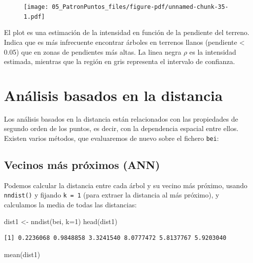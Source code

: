\documentclass[
  letterpaper,
  DIV=11,
  numbers=noendperiod]{scrreprt}
\newenvironment{Shaded}{\begin{snugshade}}{\end{snugshade}}
\newcommand{\AttributeTok}[1]{\textcolor[rgb]{0.40,0.45,0.13}{#1}}
\newcommand{\DecValTok}[1]{\textcolor[rgb]{0.68,0.00,0.00}{#1}}
\newcommand{\FunctionTok}[1]{\textcolor[rgb]{0.28,0.35,0.67}{#1}}
\newcommand{\NormalTok}[1]{\textcolor[rgb]{0.00,0.23,0.31}{#1}}
\newcommand{\OtherTok}[1]{\textcolor[rgb]{0.00,0.23,0.31}{#1}}
\begin{document}
\begin{figure}[H]

{\centering \texttt{[image: 05\_PatronPuntos\_files/figure-pdf/unnamed-chunk-35-1.pdf]}

}

\end{figure}

El plot es una estimación de la intensidad en función de la pendiente
del terreno. Indica que es más infrecuente encontrar árboles en terrenos
llanos (pendiente \textless{} 0.05) que en zonas de pendientes más
altas. La linea negra \(\rho\) es la intensidad estimada, mientras que
la región en gris representa el intervalo de confianza.

\hypertarget{anuxe1lisis-basados-en-la-distancia}{%
\section{Análisis basados en la
distancia}\label{anuxe1lisis-basados-en-la-distancia}}

Los análisis basados en la distancia están relacionados con las
propiedades de segundo orden de los puntos, es decir, con la dependencia
espacial entre ellos. Existen varios métodos, que evaluaremos de nuevo
sobre el fichero \texttt{bei}:

\hypertarget{vecinos-muxe1s-pruxf3ximos-ann}{%
\subsection{Vecinos más próximos
(ANN)}\label{vecinos-muxe1s-pruxf3ximos-ann}}

Podemos calcular la distancia entre cada árbol y su vecino más próximo,
usando \texttt{nndist()} y fijando \texttt{k\ =\ 1} (para extraer la
distancia al más próximo), y calculamos la media de todas las
distancias:

\begin{Shaded}
\begin{Highlighting}[]
\NormalTok{dist1 }\OtherTok{\textless{}{-}} \FunctionTok{nndist}\NormalTok{(bei, }\AttributeTok{k=}\DecValTok{1}\NormalTok{)}
\FunctionTok{head}\NormalTok{(dist1)}
\end{Highlighting}
\end{Shaded}

\begin{verbatim}
[1] 0.2236068 0.9848858 3.3241540 8.0777472 5.8137767 5.9203040
\end{verbatim}

\begin{Shaded}
\begin{Highlighting}[]
\FunctionTok{mean}\NormalTok{(dist1)}
\end{Highlighting}
\end{Shaded}
\end{document}
